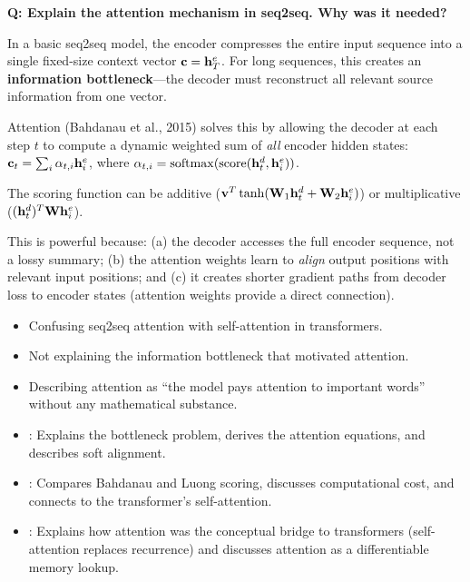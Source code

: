 \begin{interviewq}
\textbf{Q: Explain the attention mechanism in seq2seq. Why was it needed?}

 \quad {} \quad
\badgefreq{\freqhigh}

\stronganswer
In a basic seq2seq model, the encoder compresses the entire input
sequence into a single fixed-size context vector $\mathbf{c} = \mathbf{h}_T^e$.  For
long sequences, this creates an \textbf{information bottleneck}---the
decoder must reconstruct all relevant source information from one vector.

Attention (Bahdanau et al., 2015) solves this by allowing the decoder at
each step $t$ to compute a dynamic weighted sum of \emph{all} encoder
hidden states:
$\mathbf{c}_t = \sum_i \alpha_{t,i} \mathbf{h}_i^e$,
where $\alpha_{t,i} = \operatorname{softmax}(\text{score}(\mathbf{h}_t^d, \mathbf{h}_i^e))$.

The scoring function can be additive
($\mathbf{v}^T \tanh(\mathbf{W}_1 \mathbf{h}_t^d + \mathbf{W}_2 \mathbf{h}_i^e)$)
or multiplicative ($(\mathbf{h}_t^d)^T \mathbf{W} \mathbf{h}_i^e$).

This is powerful because: (a) the decoder accesses the full encoder
sequence, not a lossy summary; (b) the attention weights learn to
\emph{align} output positions with relevant input positions; and (c) it
creates shorter gradient paths from decoder loss to encoder states
(attention weights provide a direct connection).

\redflags
\begin{itemize}
\item Confusing seq2seq attention with self-attention in transformers.
\item Not explaining the information bottleneck that motivated attention.
\item Describing attention as ``the model pays attention to important
  words'' without any mathematical substance.
\end{itemize}


\goodgreat
\begin{itemize}
\item {}: Explains the bottleneck problem, derives the
  attention equations, and describes soft alignment.
\item {}: Compares Bahdanau and Luong scoring, discusses
  computational cost, and connects to the transformer's self-attention.
\item {}: Explains how attention was the conceptual
  bridge to transformers (self-attention replaces recurrence) and
  discusses attention as a differentiable memory lookup.
\end{itemize}

\end{interviewq}

